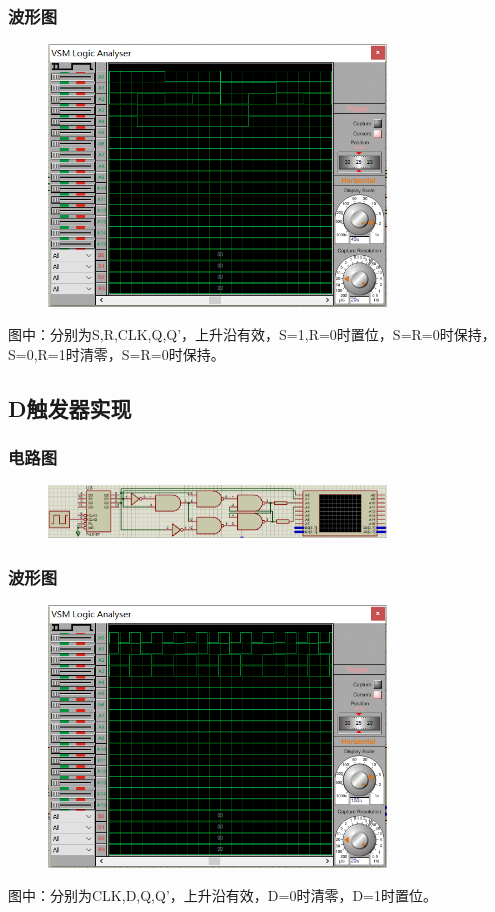 \documentclass[UTF8, a4paper, 11pt]{article}
\begin{document}
\subsubsection{波形图}
\begin{figure}[H]
    \centering
    \includegraphics[width=0.8\textwidth]{ex9.6波形图.png}
\end{figure}
图中：分别为S,R,CLK,Q,Q'，上升沿有效，S=1,R=0时置位，S=R=0时保持，S=0,R=1时清零，S=R=0时保持。
\subsection{D触发器实现}
\subsubsection{电路图}
\begin{figure}[H]
    \centering
    \includegraphics[width=0.8\textwidth]{ex9.7电路图.png}
\end{figure}
\subsubsection{波形图}
\begin{figure}[H]
    \centering
    \includegraphics[width=0.8\textwidth]{ex9.7波形图.png}
\end{figure}
图中：分别为CLK,D,Q,Q'，上升沿有效，D=0时清零，D=1时置位。
\end{document}
